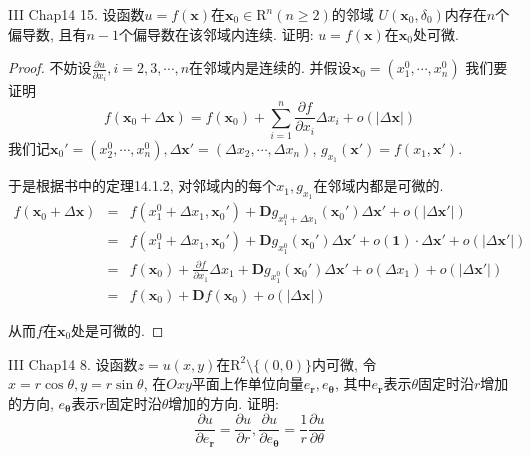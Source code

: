 \documentclass[a4paper,12pt]{article}
\begin{document}
\noindent III Chap14 15. 设函数$u=f(\bm{x})$在$\bm{x}_0\in\mathrm{R}^n(n\geq2)$的邻域
$U(\bm{x}_0,\delta_0)$内存在$n$个偏导数, 且有$n-1$个偏导数在该邻域内连续. 
证明: $u=f(\bm{x})$在$\bm{x}_0$处可微.
\begin{proof}
  不妨设$\frac{\partial u}{\partial x_i},i=2,3,\cdots,n$在邻域内是连续的. 
  并假设$\bm{x}_0=(x_1^0,\cdots,x_n^0)$
  我们要证明
  \[f(\bm{x}_0+\Delta \bm{x})=f(\bm{x}_0)+\sum_{i=1}^{n}\frac{\partial f}{\partial x_i}\Delta x_i+o(|\Delta \bm{x}|)\]
  我们记$\bm{x}_0'=(x_2^0,\cdots,x_n^0), \Delta \bm{x}'=(\Delta x_2,\cdots,\Delta x_n)$, $g_{x_1}(\bm{x}')=f(x_1,\bm{x}')$.

  于是根据书中的定理14.1.2, 对邻域内的每个$x_1,g_{x_1}$在邻域内都是可微的.
  \begin{eqnarray*}
    f(\bm{x}_0+\Delta \bm{x})&=&f(x_1^0+\Delta x_1,\bm{x}_0')+\bm{D}g_{x_1^0+\Delta x_1}(\bm{x}_0')\Delta\bm{x}'+o(|\Delta\bm{x}'|)\\
    &=&f(x_1^0+\Delta x_1,\bm{x}_0')+\bm{D}g_{x_1^0}(\bm{x}_0')\Delta\bm{x}'+o(\bm{1})\cdot\Delta\bm{x}'+o(|\Delta\bm{x}'|)\\
    &=&f(\bm{x}_0)+\frac{\partial f}{\partial x_1}\Delta x_1+\bm{D}g_{x_1^0}(\bm{x}_0')\Delta\bm{x}'+o(\Delta x_1)+o(|\Delta\bm{x}'|)\\
    &=&f(\bm{x}_0)+\bm{D}f(\bm{x}_0)+o(|\Delta\bm{x}|)
  \end{eqnarray*}

  从而$f$在$\bm{x}_0$处是可微的.
\end{proof}
\noindent III Chap14 8. 设函数$z=u(x,y)$在$\mathrm{R}^2\setminus\{(0,0)\}$内可微, 令$x=r\cos\theta,y=r\sin\theta$, 在$Oxy$平面上作单位向量$e_{\bm{r}},e_{\bm{\theta}}$, 其中$e_{\bm{r}}$表示$\theta$固定时沿$r$增加的方向, $e_{\bm{\theta}}$表示$r$固定时沿$\theta$增加的方向. 证明:
\[\frac{\partial u}{\partial e_{\bm{r}}}=\frac{\partial u}{\partial r},\frac{\partial u}{\partial e_{\bm{\theta}}}=\frac{1}{r}\frac{\partial u}{\partial \theta}\]
\end{document}
